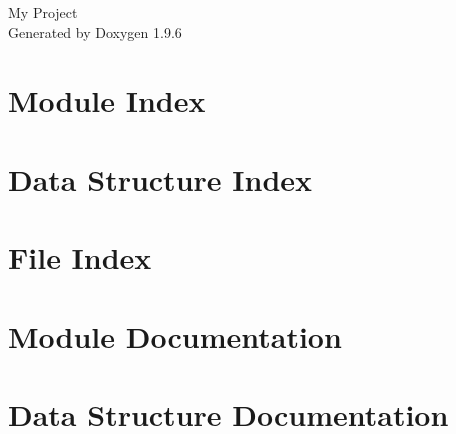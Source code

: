 \documentclass[twoside]{book}
\newcommand{\+}{\discretionary{\mbox{\scriptsize$\hookleftarrow$}}{}{}}
\newcommand{\clearemptydoublepage}{%
    \newpage{\pagestyle{empty}\cleardoublepage}%
  }
\begin{document}
  \raggedbottom
    \hypersetup{pageanchor=false,
                bookmarksnumbered=true,
                pdfencoding=unicode
               }
  \begin{titlepage}
  \vspace*{7cm}
  \begin{center}%
  {\Large My Project}\\
  \vspace*{1cm}
  {\large Generated by Doxygen 1.9.6}\\
  \end{center}
  \end{titlepage}
  \clearemptydoublepage
  \tableofcontents
  \clearemptydoublepage
  \hypersetup{pageanchor=true}
\chapter{Module Index}

\chapter{Data Structure Index}

\chapter{File Index}

\chapter{Module Documentation}











\chapter{Data Structure Documentation}






\end{document}
